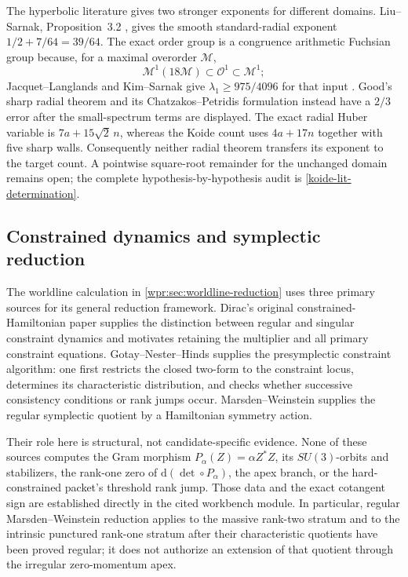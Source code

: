 The hyperbolic literature gives two stronger exponents for different
domains.  Liu--Sarnak, Proposition~3.2 \cite{LiuSarnak_2010}, gives the
smooth standard-radial exponent \(1/2+7/64=39/64\).  The exact order group
is a congruence arithmetic Fuchsian group because, for a maximal overorder
\(\mathcal M\),
\[
 \mathcal M^1(18\mathcal M)\subset\mathcal O^1\subset\mathcal M^1;
\]
Jacquet--Langlands and Kim--Sarnak give
\(\lambda_1\geq975/4096\) for that input
\cite{KimSarnak_2003,ChuLi_2016}.  Good's sharp radial theorem and its
Chatzakos--Petridis formulation \cite{Good_1983,ChatzakosPetridis_2016}
instead have a \(2/3\) error after the small-spectrum terms are displayed.
The exact radial Huber variable is \(7a+15\sqrt2\,n\), whereas the Koide
count uses \(4a+17n\) together with five sharp walls.  Consequently neither
radial theorem transfers its exponent to the target count.  A pointwise
square-root remainder for the unchanged domain remains open; the complete
hypothesis-by-hypothesis audit is \cref{koide-lit-determination}.

\subsection{Constrained dynamics and symplectic reduction}

The worldline calculation in
\cref{wpr:sec:worldline-reduction} uses three primary sources for its
general reduction framework.  Dirac's original constrained-Hamiltonian
paper \cite{Dirac1950} supplies the distinction between regular and singular
constraint dynamics and motivates retaining the multiplier and all primary
constraint equations.  Gotay--Nester--Hinds
\cite{GotayNesterHinds1978} supplies the presymplectic constraint algorithm:
one first restricts the closed two-form to the constraint locus, determines
its characteristic distribution, and checks whether successive consistency
conditions or rank jumps occur.  Marsden--Weinstein
\cite{MarsdenWeinstein1974} supplies the regular symplectic quotient by a
Hamiltonian symmetry action.

Their role here is structural, not candidate-specific evidence.  None of
these sources computes the Gram morphism
$P_\alpha(Z)=\alpha Z^*Z$, its $SU(3)$-orbits and stabilizers, the
rank-one zero of $\mathrm d(\det\circ P_\alpha)$, the apex branch, or the
hard-constrained packet's threshold rank jump.  Those data and the exact
cotangent sign are established directly in the cited workbench module.  In
particular, regular Marsden--Weinstein reduction applies to the massive
rank-two stratum and to the intrinsic punctured rank-one stratum after their
characteristic quotients have been proved regular; it does not authorize an
extension of that quotient through the irregular zero-momentum apex.

